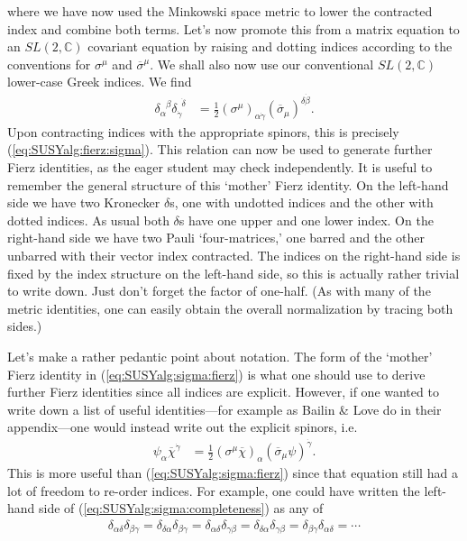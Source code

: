 \documentclass[12pt, oneside]{report}    %
\begin{document}
where we have now used the Minkowski space metric to lower the contracted index and combine both terms. Let's now promote this from a matrix equation to an  $SL(2,\mathbb C)$ covariant equation by raising and dotting indices according to the conventions for $\sigma^\mu$ and $\overline\sigma^\mu$. We shall also now use our conventional $SL(2,\mathbb C)$ lower-case Greek indices. We find
\begin{align}
    \delta_\alpha^{\phantom\alpha\beta}\delta_{\dot\gamma}^{\phantom\gamma\dot\delta} &= \frac 12 (\sigma^\mu)_{\alpha\dot\gamma}(\overline\sigma_\mu)^{\delta\dot\beta}.\label{eq:SUSYalg:sigma:fierz}
\end{align}
Upon contracting indices with the appropriate spinors, this is precisely  (\ref{eq:SUSYalg:fierz:sigma}). This relation can now be used to generate further Fierz identities, as the eager student may check independently. It is useful to remember the general structure of this `mother' Fierz identity. On the left-hand side we have two Kronecker $\delta$s, one with undotted indices and the other with dotted indices. As usual both $\delta$s have one upper and one lower index. On the right-hand side we have two Pauli `four-matrices,' one barred and the other unbarred with their vector index contracted. The indices on the right-hand side is fixed by the index structure on the left-hand side, so this is actually rather trivial to write down. Just don't forget the factor of one-half. (As with many of the metric identities, one can easily obtain the overall normalization by tracing both sides.)

\begin{example}
Let's make a rather pedantic point about notation. The form of the `mother' Fierz identity in  (\ref{eq:SUSYalg:sigma:fierz}) is what one should use to derive further Fierz identities since all indices are explicit. However, if one wanted to write down a list of useful identities---for example as Bailin \& Love\autocite{Bailin:1994qt} do in their appendix---one would instead write out the explicit spinors, i.e.
  \begin{align}
      \psi_\alpha\overline\chi^{\dot\gamma} &= \frac 12 (\sigma^\mu\overline\chi)_\alpha(\overline\sigma_\mu\psi)^{\dot\gamma}.
  \end{align}
This is more useful than  (\ref{eq:SUSYalg:sigma:fierz}) since that equation still had a lot of freedom to re-order indices. For example, one could have written the left-hand side of  (\ref{eq:SUSYalg:sigma:completeness}) as any of
\begin{align}
  \delta_{\alpha\delta}\delta_{\beta\gamma} = \delta_{\delta\alpha}\delta_{\beta\gamma} = \delta_{\alpha\delta}\delta_{\gamma\beta} = \delta_{\delta\alpha}\delta_{\gamma\beta} = \delta_{\beta\gamma}\delta_{\alpha\delta} = \cdots
\end{align}
\end{example}
\end{document}
